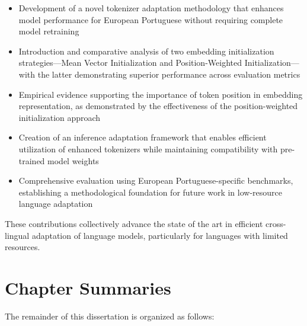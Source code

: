 \begin{itemize}
    \item Development of a novel tokenizer adaptation methodology that enhances model performance for European Portuguese without requiring complete model retraining
    
    \item Introduction and comparative analysis of two embedding initialization strategies—Mean Vector Initialization and Position-Weighted Initialization—with the latter demonstrating superior performance across evaluation metrics
    
    \item Empirical evidence supporting the importance of token position in embedding representation, as demonstrated by the effectiveness of the position-weighted initialization approach
    
    \item Creation of an inference adaptation framework that enables efficient utilization of enhanced tokenizers while maintaining compatibility with pre-trained model weights
    
    \item Comprehensive evaluation using European Portuguese-specific benchmarks, establishing a methodological foundation for future work in low-resource language adaptation
\end{itemize}

These contributions collectively advance the state of the art in efficient cross-lingual adaptation of language models, particularly for languages with limited resources.

\section{Chapter Summaries}\label{Section1.5}
The remainder of this dissertation is organized as follows:

